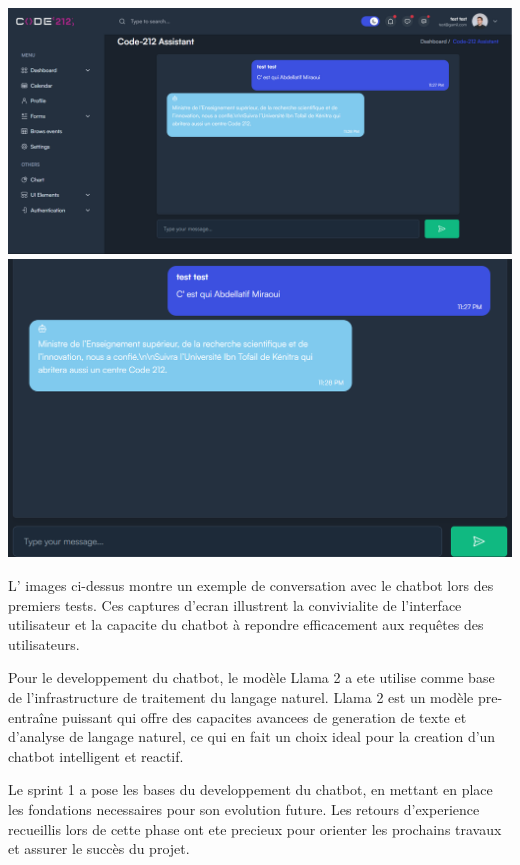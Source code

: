 \documentclass[a4paper, 11pt, openany]{report}
\begin{document}
\begin{center}
    \includegraphics[width=1\textwidth]{assets/images/chat1.png}
    \includegraphics[width=1\textwidth]{assets/images/chat2.png}
\end{center}

L' images ci-dessus montre un exemple de conversation avec le chatbot lors des premiers tests. Ces captures d'ecran illustrent la convivialite de l'interface utilisateur et la capacite du chatbot à repondre efficacement aux requêtes des utilisateurs.


Pour le developpement du chatbot, le modèle Llama 2 a ete utilise comme base de l'infrastructure de traitement du langage naturel. Llama 2 est un modèle pre-entraîne puissant qui offre des capacites avancees de generation de texte et d'analyse de langage naturel, ce qui en fait un choix ideal pour la creation d'un chatbot intelligent et reactif.

Le sprint 1 a pose les bases du developpement du chatbot, en mettant en place les fondations necessaires pour son evolution future. Les retours d'experience recueillis lors de cette phase ont ete precieux pour orienter les prochains travaux et assurer le succès du projet.
\end{document}

